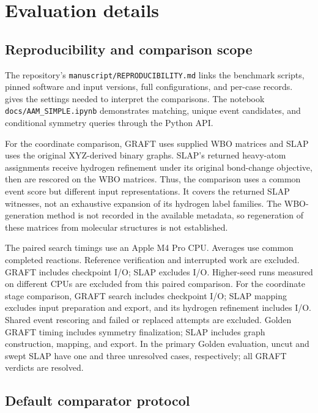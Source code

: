 \section{Evaluation details}
\label{sec:reproducibility}
\setcounter{table}{0}
\renewcommand{\thetable}{A\arabic{table}}

\subsection{Reproducibility and comparison scope}

The repository's \texttt{manuscript/REPRODUCIBILITY.md} links the benchmark scripts, pinned software and input versions, full configurations, and per-case records.  gives the settings needed to interpret the comparisons. The notebook \texttt{docs/AAM\_SIMPLE.ipynb} demonstrates matching, unique event candidates, and conditional symmetry queries through the Python API.

For the coordinate comparison, GRAFT uses supplied WBO matrices and SLAP uses the original XYZ-derived binary graphs. SLAP's returned heavy-atom assignments receive hydrogen refinement under its original bond-change objective, then are rescored on the WBO matrices. Thus, the comparison uses a common event score but different input representations. It covers the returned SLAP witnesses, not an exhaustive expansion of its hydrogen label families. The WBO-generation method is not recorded in the available metadata, so regeneration of these matrices from molecular structures is not established.

The paired search timings use an Apple M4 Pro CPU. Averages use \CommonCases{} common completed reactions. Reference verification and interrupted work are excluded. GRAFT includes checkpoint I/O; SLAP excludes I/O. Higher-seed runs measured on different CPUs are excluded from this paired comparison. For the coordinate stage comparison, GRAFT search includes checkpoint I/O; SLAP mapping excludes input preparation and export, and its hydrogen refinement includes I/O. Shared event rescoring and failed or replaced attempts are excluded. Golden GRAFT timing includes symmetry finalization; SLAP includes graph construction, mapping, and export. In the primary Golden evaluation, uncut and swept SLAP have one and three unresolved cases, respectively; all GRAFT verdicts are resolved.

\subsection{Default comparator protocol}
\label{sec:default-comparators}

